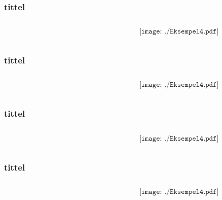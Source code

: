 \documentclass[aspectratio=169,xcolor=dvipsnames]{beamer}
\begin{document}
\begin{frame} \frametitle{tittel}
	\begin{columns}
		\begin{column}{0.5\textwidth}
			
		\end{column}
		\begin{column}{0.5\textwidth}
			$$\texttt{[image: ./Eksempel4.pdf]}$$
		\end{column}
	\end{columns}
\end{frame}

\begin{frame} \frametitle{tittel}
	\begin{columns}
		\begin{column}{0.5\textwidth}
			
		\end{column}
		\begin{column}{0.5\textwidth}
			$$\texttt{[image: ./Eksempel4.pdf]}$$
		\end{column}
	\end{columns}
\end{frame}

\begin{frame} \frametitle{tittel}
	\begin{columns}
		\begin{column}{0.5\textwidth}
			
		\end{column}
		\begin{column}{0.5\textwidth}
			$$\texttt{[image: ./Eksempel4.pdf]}$$
		\end{column}
	\end{columns}
\end{frame}

\begin{frame} \frametitle{tittel}
	\begin{columns}
		\begin{column}{0.5\textwidth}
			
		\end{column}
		\begin{column}{0.5\textwidth}
			$$\texttt{[image: ./Eksempel4.pdf]}$$
		\end{column}
	\end{columns}
\end{frame}
\end{document}
